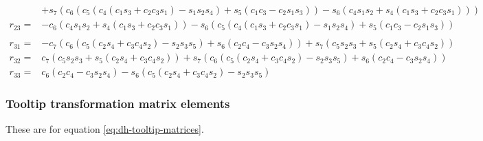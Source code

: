 \begin{equation}
\begin{split}
            &+ s_{7} \left(c_{6} \left(c_{5} \left(c_{4} \left(c_{1} s_{3} + c_{2} c_{3} s_{1}\right) - s_{1} s_{2} s_{4}\right) + s_{5} \left(c_{1} c_{3} - c_{2} s_{1} s_{3}\right)\right) - s_{6} \left(c_{4} s_{1} s_{2} + s_{4} \left(c_{1} s_{3} + c_{2} c_{3} s_{1}\right)\right)\right) \\
        r_{23} =& - c_{6} \left(c_{4} s_{1} s_{2} + s_{4} \left(c_{1} s_{3} + c_{2} c_{3} s_{1}\right)\right) - s_{6} \left(c_{5} \left(c_{4} \left(c_{1} s_{3} + c_{2} c_{3} s_{1}\right) - s_{1} s_{2} s_{4}\right) + s_{5} \left(c_{1} c_{3} - c_{2} s_{1} s_{3}\right)\right) \\
        \\
        r_{31} =& - c_{7} \left(c_{6} \left(c_{5} \left(c_{2} s_{4} + c_{3} c_{4} s_{2}\right) - s_{2} s_{3} s_{5}\right) + s_{6} \left(c_{2} c_{4} - c_{3} s_{2} s_{4}\right)\right) + s_{7} \left(c_{5} s_{2} s_{3} + s_{5} \left(c_{2} s_{4} + c_{3} c_{4} s_{2}\right)\right) \\
        r_{32} =& c_{7} \left(c_{5} s_{2} s_{3} + s_{5} \left(c_{2} s_{4} + c_{3} c_{4} s_{2}\right)\right) + s_{7} \left(c_{6} \left(c_{5} \left(c_{2} s_{4} + c_{3} c_{4} s_{2}\right) - s_{2} s_{3} s_{5}\right) + s_{6} \left(c_{2} c_{4} - c_{3} s_{2} s_{4}\right)\right) \\
        r_{33} =& c_{6} \left(c_{2} c_{4} - c_{3} s_{2} s_{4}\right) - s_{6} \left(c_{5} \left(c_{2} s_{4} + c_{3} c_{4} s_{2}\right) - s_{2} s_{3} s_{5}\right)
    \end{split}
    \label{eq:app-7r-tf-rot-vals}
\end{equation}

\subsubsection*{Tooltip transformation matrix elements}

These are for equation \ref{eq:dh-tooltip-matrices}.

